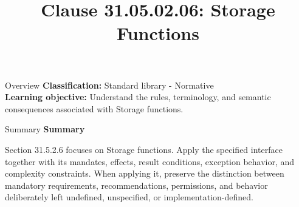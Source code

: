 \documentclass[10pt,letterpaper]{article}
\title{Clause 31.05.02.06: Storage Functions}
\author{}
\date{}
\begin{document}
\maketitle
\begin{CornellOverviewBox}{Overview}
\textbf{Classification:} Standard library - Normative\\[2pt]
\textbf{Learning objective:} Understand the rules, terminology, and semantic consequences associated with Storage functions.
\end{CornellOverviewBox}\begin{CornellSummaryBox}{Summary}
{\sffamily\bfseries\color{Accent} Summary}\par\vspace{3pt}Section 31.5.2.6 focuses on Storage functions. Apply the specified interface together with its mandates, effects, result conditions, exception behavior, and complexity constraints. When applying it, preserve the distinction between mandatory requirements, recommendations, permissions, and behavior deliberately left undefined, unspecified, or implementation-defined.
\end{CornellSummaryBox}
\end{document}
